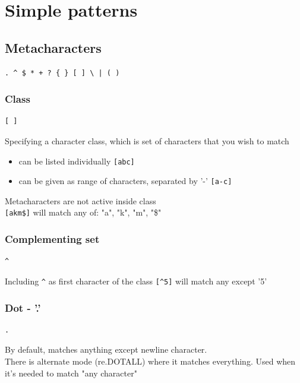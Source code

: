 \documentclass{beamer}
\begin{document}
\section{Simple patterns}
\subsection{Metacharacters}
\begin{frame}[fragile]
\begin{verbatim}
. ^ $ * + ? { } [ ] \ | ( )
\end{verbatim}
\end{frame}

\subsubsection{Class}
\begin{frame}[fragile]
\begin{verbatim}
[ ]
\end{verbatim}
Specifying a character class, which is set of characters that you wish to match
 \begin{itemize}
  \item can be listed individually \verb/[abc]/
  \item can be given as range of characters, separated by '-' \verb/[a-c]/
 \end{itemize}
\pause
Metacharacters are not active inside class \\
\verb/[akm$]/ will match any of: "a", "k", "m", "\$"
\end{frame}

\subsubsection{Complementing set}
\begin{frame}[fragile]
\begin{verbatim}
^
\end{verbatim}
Including \verb/^/ as first character of the class \verb/[^5]/ will match any except '5'
\end{frame}

\subsubsection{Dot - '.'}
\begin{frame}[fragile]
\begin{verbatim}
.
\end{verbatim}
By default, matches anything except newline character. \\
\pause
There is alternate mode (re.DOTALL) where it matches everything. Used when it's needed to match "any character"
\end{frame}
\end{document}
